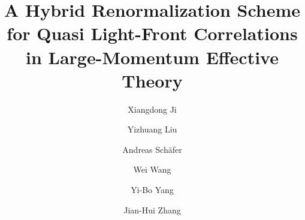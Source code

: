 \documentclass[preprint,12pt]{elsarticle}
\begin{document}
\begin{frontmatter}



\title{A Hybrid Renormalization Scheme for Quasi Light-Front Correlations in Large-Momentum Effective Theory}


\author{Xiangdong Ji}
\address{Center for Nuclear Femtography, SURA, 1201 New York Ave. NW, Washington, DC 20005, USA}
\address{Maryland Center for Fundamental Physics,
Department of Physics, University of Maryland,
College Park, Maryland 20742, USA}

\author{Yizhuang Liu}
\address{Tsung-Dao Lee Institute, Shanghai Jiao Tong University, Shanghai, 200240, China}

\author{Andreas Sch\"{a}fer}
\address{Institut f\"{u}r Theoretische Physik, Universit\"{a}t Regensburg, D-93040 Regensburg, Germany}

\author{Wei Wang}
\address{INPAC, Shanghai Key Laboratory for Particle Physics and Cosmology, MOE Key Lab for Particle Physics, Astrophysics and Cosmology, School of Physics and Astronomy, Shanghai Jiao Tong University, Shanghai, 200240, China}

\author{Yi-Bo Yang}
\address{CAS Key Laboratory of Theoretical Physics, Institute of Theoretical Physics, Chinese Academy of Sciences, Beijing 100190, China}
\address{School of Fundamental Physics and Mathematical Sciences, Hangzhou Institute for Advanced Study, UCAS, Hangzhou 310024, China}
\address{International Centre for Theoretical Physics Asia-Pacific, Beijing/Hangzhou, China}

\author{Jian-Hui Zhang}
\address{Center of Advanced Quantum Studies, Department of Physics, Beijing Normal University, Beijing 100875, China}


\end{frontmatter}
\end{document}
